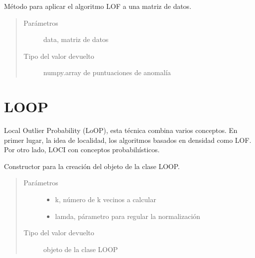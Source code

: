 \documentclass[letterpaper,10pt,spanish]{sphinxmanual}
\begin{document}
\begin{fulllineitems}
\label{\detokenize{index:fit_predict}}
Método para aplicar el algoritmo LOF a una matriz de datos.
\begin{quote}\begin{description}
\item[{Parámetros}] \leavevmode
{} \textendash{} data, matriz de datos

\item[{Tipo del valor devuelto}] \leavevmode
numpy.array de puntuaciones de anomalía

\end{description}\end{quote}

\end{fulllineitems}



\chapter{LOOP}
\label{\detokenize{index:loop}}
Local Outlier Probability (LoOP), esta técnica combina varios conceptos.
En primer lugar, la idea de localidad, los algoritmos basados en densidad
como LOF. Por otro lado, LOCI
con conceptos probabilıísticos.

\begin{fulllineitems}
\label{\detokenize{index:LOOP}}
Constructor para la creación del objeto de la clase LOOP.
\begin{quote}\begin{description}
\item[{Parámetros}] \leavevmode\begin{itemize}
\item {} 
 \textendash{} k, número de k vecinos a calcular

\item {} 
 \textendash{} lamda, párametro para regular la normalización

\end{itemize}

\item[{Tipo del valor devuelto}] \leavevmode
objeto de la clase LOOP

\end{description}\end{quote}

\end{fulllineitems}
\end{document}
